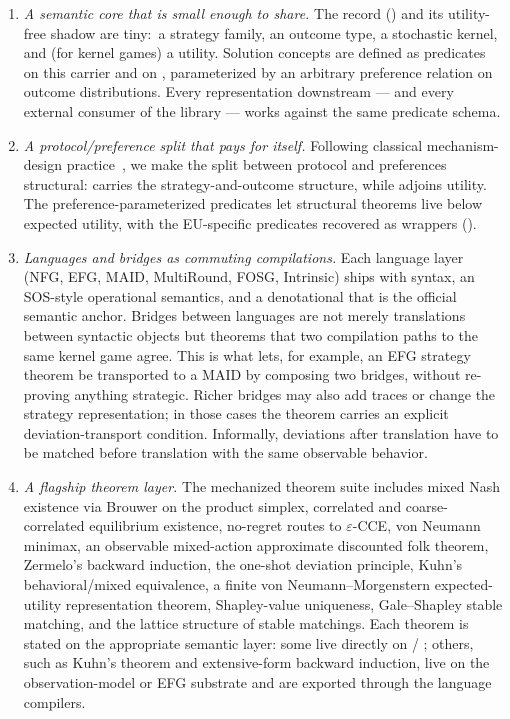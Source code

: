 \begin{enumerate}[leftmargin=*]

\item \emph{A semantic core that is small enough to share.}  The
 record () and its
utility-free shadow  are tiny:\ a strategy family, an
outcome type, a stochastic kernel, and (for kernel games) a utility.
Solution concepts are defined as predicates on this carrier and on
, parameterized by an arbitrary preference relation on
outcome distributions.  Every representation downstream — and every
external consumer of the library — works against the same predicate
schema.

\item \emph{A protocol/preference split that pays for itself.}
Following classical mechanism-design practice~\citep{Myerson1991},
we make the split between protocol and preferences structural:
 carries the strategy-and-outcome structure, while
 adjoins utility.  The preference-parameterized
 predicates let structural theorems live below expected
utility, with the EU-specific predicates recovered as wrappers
().

\item \emph{Languages and bridges as commuting compilations.}  Each
language layer (NFG, EFG, MAID, MultiRound, FOSG, Intrinsic) ships with
syntax, an SOS-style operational semantics, and a denotational
 that is the official semantic anchor.  Bridges
between languages are not merely translations between syntactic
objects but theorems that two compilation paths to the same kernel
game agree.  This is what lets, for example, an EFG strategy theorem
be transported to a MAID by composing two bridges, without
re-proving anything strategic.  Richer bridges may also add traces or
change the strategy representation; in those cases the theorem carries
an explicit deviation-transport condition.  Informally, deviations
after translation have to be matched before translation with the same
observable behavior.

\item \emph{A flagship theorem layer.}  The mechanized theorem suite
includes mixed Nash existence via Brouwer on the product simplex,
correlated and coarse-correlated equilibrium existence, no-regret
routes to $\varepsilon$-CCE, von Neumann minimax, an observable
mixed-action approximate discounted folk theorem, Zermelo's backward
induction, the one-shot deviation principle, Kuhn's behavioral/mixed
equivalence, a finite von Neumann--Morgenstern expected-utility
representation theorem, Shapley-value uniqueness, Gale--Shapley stable
matching, and the lattice structure of stable matchings.  Each theorem
is stated on the appropriate semantic layer: some live directly on
 / ; others, such as Kuhn's theorem and
extensive-form backward induction, live on the observation-model or EFG
substrate and are exported through the language compilers.


\end{enumerate}
